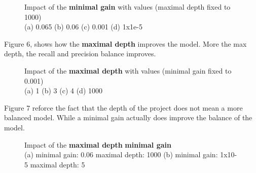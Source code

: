 \begin{answer}
    \begin{figure}
        \centering
        \caption{Impact of the \textbf{minimal gain} with values (maximal depth fixed to 1000)
            \\
            (a) 0.065 (b) 0.06 (c) 0.001 (d) 1x1e-5}
    \end{figure}
    Figure 6, shows how the \textbf{maximal depth} improves the model. More the max depth, the recall and
    precision balance improves.
    \begin{figure}
        \centering
        \caption{Impact of the \textbf{maximal depth} with values (minimal gain fixed to 0.001)
            \\
            (a) 1 (b) 3 (c) 4 (d) 1000}
    \end{figure}
    Figure 7 reforce the fact that the depth of the project does not mean a more balanced model. While a
    minimal gain actually does improve the balance of the model.
    \begin{figure}
        \centering
        \caption{Impact of the \textbf{maximal depth} \textbf{minimal gain}
        \\
        (a) minimal gain: 0.06 maximal depth: 1000 (b) minimal gain: 1x10-5 maximal depth: 5}
    \end{figure}
\end{answer}
\pagebreak